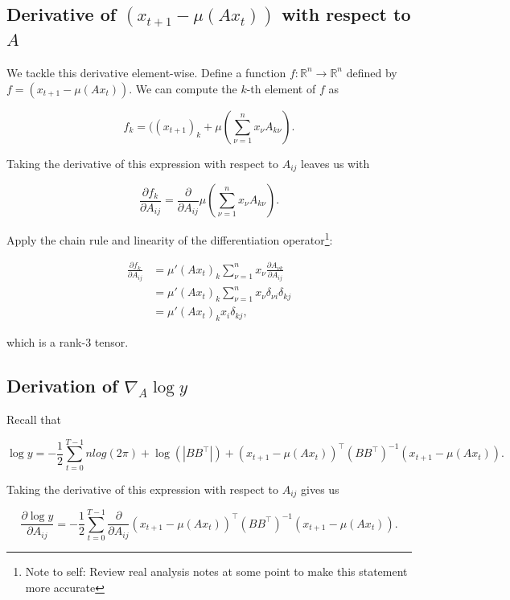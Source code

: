\documentclass[12pt]{article}
\theoremstyle{definition}
\begin{document}
\subsection{Derivative of $(x_{t+1} - \mu(Ax_t))$ with respect to $A$}
\label{subsec:yTermDerivative}

We tackle this derivative element-wise. Define a function $f: \mathbb{R}^{n} \rightarrow \mathbb{R}^n$ defined by $f = (x_{t+1} - \mu(Ax_t))$. We can compute the $k$-th element of $f$ as 

\[
f_k = ((x_{t+1})_k + \mu(\sum_{\nu = 1}^{n} x_\nu A_{k\nu}).
\]

Taking the derivative of this expression with respect to $A_{ij}$ leaves us with

\[
\frac{\partial f_k}{\partial A_{ij}} = \frac{\partial}{\partial A_{ij}} \mu(\sum_{\nu = 1}^{n} x_\nu A_{k\nu}).
\]

Apply the chain rule and linearity of the differentiation operator\footnote{Note to self: Review real analysis notes at some point to make this statement more accurate}:

\[
\begin{split}
    \frac{\partial f_k}{\partial A_{ij}} &= \mu'(Ax_t)_k \sum_{\nu = 1}^{n}x_\nu \frac{\partial A_{\nu k}}{\partial A_{ij}} \\ 
    & = \mu'(Ax_t)_k \sum_{\nu = 1}^{n}x_\nu \delta_{\nu i} \delta_{kj} \\ 
    & = \mu'(Ax_t)_k x_i \delta_{kj},
\end{split}
\]

which is a rank-$3$ tensor. 

\subsection{Derivation of $\nabla_A \log y$}
\label{subsec:gradADerivation}

Recall that 

\[
\log y =  - \frac{1}{2} \sum_{t=0}^{T - 1} n log(2\pi) + \log(|BB^\top|) + (x_{t+1} - \mu(Ax_t))^\top (BB^\top)^{-1} (x_{t+1} - \mu(Ax_t)).
\] 

Taking the derivative of this expression with respect to $A_{ij}$ gives us

\begin{equation}
    \label{eqn:likelihoodDerivativeA}
    \frac{\partial \log y}{\partial A_{ij}} = - \frac{1}{2} \sum_{t=0}^{T - 1} \frac{\partial}{\partial A_{ij}} (x_{t+1} - \mu(Ax_t))^\top (BB^\top)^{-1} (x_{t+1} - \mu(Ax_t)).
\end{equation}
\end{document}
